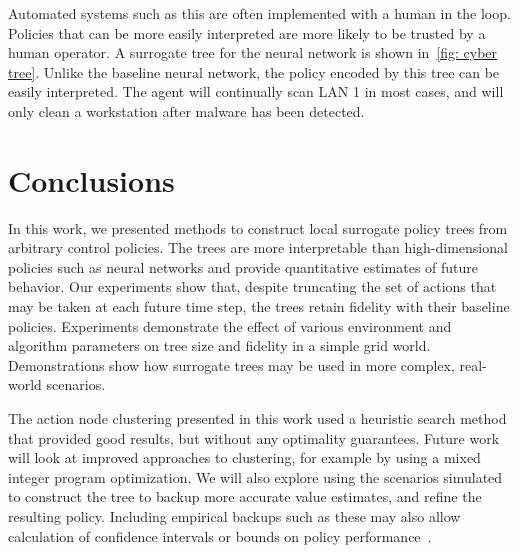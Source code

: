 \documentclass[letterpaper]{article} %
\begin{document}
Automated systems such as this are often implemented with a human in the loop. 
Policies that can be more easily interpreted are more likely to be trusted by a human operator. 
A surrogate tree for the neural network is shown in~\cref{fig: cyber tree}.
Unlike the baseline neural network, the policy encoded by this tree can be easily interpreted. 
The agent will continually scan LAN 1 in most cases, and will only clean a workstation after malware has been detected.

\section{Conclusions}
In this work, we presented methods to construct local surrogate policy trees from arbitrary control policies. 
The trees are more interpretable than high-dimensional policies such as neural networks and provide quantitative estimates of future behavior. 
Our experiments show that, despite truncating the set of actions that may be taken at each future time step, the trees retain fidelity with their baseline policies.
Experiments demonstrate the effect of various environment and algorithm parameters on tree size and fidelity in a simple grid world.
Demonstrations show how surrogate trees may be used in more complex, real-world scenarios. 

The action node clustering presented in this work used a heuristic search method that provided good results, but without any optimality guarantees. 
Future work will look at improved approaches to clustering, for example by using a mixed integer program optimization.
We will also explore using the scenarios simulated to construct the tree to backup more accurate value estimates, and refine the resulting policy. 
Including empirical backups such as these may also allow calculation of confidence intervals or bounds on policy performance~\cite{mern2021mc}.



\end{document}
